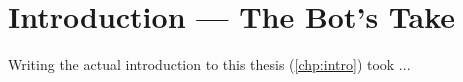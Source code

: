 \chapter{Introduction --- The Bot's Take}
\label{app:intro}

Writing the actual introduction to this thesis (\cref{chp:intro}) took ...
